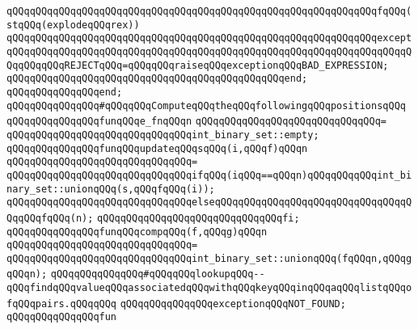 \verb|qQQqqQQqqQQqqQQqqQQqqQQqqQQqqQQqqQQqqQQqqQQqqQQqqQQqqQQqqQQqqQQqfqQQq(stqQQq(explodeqQQqrex))|\newline
\verb|qQQqqQQqqQQqqQQqqQQqqQQqqQQqqQQqqQQqqQQqqQQqqQQqqQQqqQQqqQQqqQQqexcept|\newline
\verb|qQQqqQQqqQQqqQQqqQQqqQQqqQQqqQQqqQQqqQQqqQQqqQQqqQQqqQQqqQQqqQQqqQQqqQQqqQQqqQQqREJECTqQQq=qQQqqQQqraiseqQQqexceptionqQQqBAD_EXPRESSION;|\newline
\verb|qQQqqQQqqQQqqQQqqQQqqQQqqQQqqQQqqQQqqQQqqQQqqQQqend;|\newline
\verb|qQQqqQQqqQQqqQQqend;|\newline
\newline
\newline
\newline
\verb|qQQqqQQqqQQqqQQq#qQQqqQQqComputeqQQqtheqQQqfollowingqQQqpositionsqQQq|\newline
\newline
\verb|qQQqqQQqqQQqqQQqfunqQQqe_fnqQQqn|\newline
\verb|qQQqqQQqqQQqqQQqqQQqqQQqqQQqqQQq=|\newline
\verb|qQQqqQQqqQQqqQQqqQQqqQQqqQQqqQQqint_binary_set::empty;|\newline
\newline
\verb|qQQqqQQqqQQqqQQqfunqQQqupdateqQQqsqQQq(i,qQQqf)qQQqn|\newline
\verb|qQQqqQQqqQQqqQQqqQQqqQQqqQQqqQQq=|\newline
\verb|qQQqqQQqqQQqqQQqqQQqqQQqqQQqqQQqifqQQq(iqQQq==qQQqn)qQQqqQQqqQQqint_binary_set::unionqQQq(s,qQQqfqQQq(i));|\newline
\verb|qQQqqQQqqQQqqQQqqQQqqQQqqQQqqQQqelseqQQqqQQqqQQqqQQqqQQqqQQqqQQqqQQqqQQqqQQqfqQQq(n);|\newline
\verb|qQQqqQQqqQQqqQQqqQQqqQQqqQQqqQQqfi;|\newline
\newline
\verb|qQQqqQQqqQQqqQQqfunqQQqcompqQQq(f,qQQqg)qQQqn|\newline
\verb|qQQqqQQqqQQqqQQqqQQqqQQqqQQqqQQq=|\newline
\verb|qQQqqQQqqQQqqQQqqQQqqQQqqQQqqQQqint_binary_set::unionqQQq(fqQQqn,qQQqgqQQqn);|\newline
\newline
\verb|qQQqqQQqqQQqqQQq#qQQqqQQqlookupqQQq--qQQqfindqQQqvalueqQQqassociatedqQQqwithqQQqkeyqQQqinqQQqaqQQqlistqQQqofqQQqpairs.qQQqqQQq|\newline
\verb|qQQqqQQqqQQqqQQqexceptionqQQqNOT_FOUND;|\newline
\verb|qQQqqQQqqQQqqQQqfun|\newline
